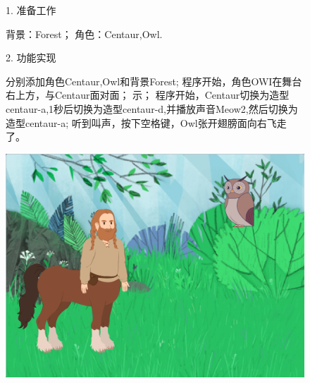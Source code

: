 \documentclass[10pt, a4paper]{article}
\begin{document}
\begin{enumerate}
        \begin{figure}[htbp]
            \begin{minipage}{.6\textwidth}
                1. 准备工作
                \begin{tasks}[label = (\arabic*)]
                    \task 背景：Forest；
                    \task 角色：Centaur,Owl.
                \end{tasks}
                2. 功能实现
                \begin{tasks}[label = (\arabic*)]
                    \task 分别添加角色Centaur,Owl和背景Forest;
                    \task 程序开始，角色OWI在舞台右上方，与Centaur面对面；
                    示；
                    \task 程序开始，Centaur切换为造型centaur-a,1秒后切换为造型centaur-d,并播放声音Meow2,然后切换为造型centaur-a;
                    \task 听到叫声，按下空格键，Owl张开翅膀面向右飞走了。
                \end{tasks}
            \end{minipage}
            \begin{minipage}{.37\textwidth}
                \centering
                \includegraphics[width=\textwidth]{37.png}
            \end{minipage}
        \end{figure}
    \end{enumerate}
\end{document}
